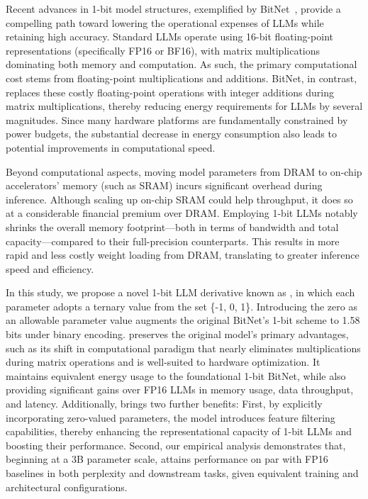 Recent advances in 1-bit model structures, exemplified by BitNet~\cite{bitnet}, provide a compelling path toward lowering the operational expenses of LLMs while retaining high accuracy. Standard LLMs operate using 16-bit floating-point representations (specifically FP16 or BF16), with matrix multiplications dominating both memory and computation. As such, the primary computational cost stems from floating-point multiplications and additions. BitNet, in contrast, replaces these costly floating-point operations with integer additions during matrix multiplications, thereby reducing energy requirements for LLMs by several magnitudes. Since many hardware platforms are fundamentally constrained by power budgets, the substantial decrease in energy consumption also leads to potential improvements in computational speed.

Beyond computational aspects, moving model parameters from DRAM to on-chip accelerators' memory (such as SRAM) incurs significant overhead during inference. Although scaling up on-chip SRAM could help throughput, it does so at a considerable financial premium over DRAM. Employing 1-bit LLMs notably shrinks the overall memory footprint—both in terms of bandwidth and total capacity—compared to their full-precision counterparts. This results in more rapid and less costly weight loading from DRAM, translating to greater inference speed and efficiency.

In this study, we propose a novel 1-bit LLM derivative known as \textbf{}, in which each parameter adopts a ternary value from the set \{-1, 0, 1\}. Introducing the zero as an allowable parameter value augments the original BitNet's 1-bit scheme to 1.58 bits under binary encoding.  preserves the original model's primary advantages, such as its shift in computational paradigm that nearly eliminates multiplications during matrix operations and is well-suited to hardware optimization. It maintains equivalent energy usage to the foundational 1-bit BitNet, while also providing significant gains over FP16 LLMs in memory usage, data throughput, and latency. Additionally,  brings two further benefits: First, by explicitly incorporating zero-valued parameters, the model introduces feature filtering capabilities, thereby enhancing the representational capacity of 1-bit LLMs and boosting their performance. Second, our empirical analysis demonstrates that, beginning at a 3B parameter scale,  attains performance on par with FP16 baselines in both perplexity and downstream tasks, given equivalent training and architectural configurations.

